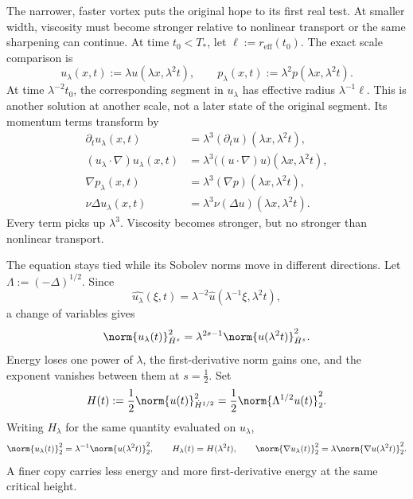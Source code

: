 
The narrower, faster vortex puts the original hope to its first real test. At smaller width, viscosity must become stronger relative to nonlinear transport or the same sharpening can continue.
At time \(t_0<T_*\), let \(\ell:=r_{\mathrm{eff}}(t_0)\). The exact scale comparison is
\[
  u_\lambda(x,t)
  :=
  \lambda u(\lambda x,\lambda^2t),
  \qquad
  p_\lambda(x,t)
  :=
  \lambda^2p(\lambda x,\lambda^2t).
\]
At time \(\lambda^{-2}t_0\), the corresponding segment in \(u_\lambda\) has effective radius \(\lambda^{-1}\ell\). This is another solution at another scale, not a later state of the original segment. Its momentum terms transform by
\[
\begin{aligned}
  \partial_tu_\lambda(x,t)
  &=
  \lambda^3(\partial_tu)(\lambda x,\lambda^2t),
  \\
  (u_\lambda\cdot\nabla)u_\lambda(x,t)
  &=
  \lambda^3\bigl((u\cdot\nabla)u\bigr)(\lambda x,\lambda^2t),
  \\
  \nabla p_\lambda(x,t)
  &=
  \lambda^3(\nabla p)(\lambda x,\lambda^2t),
  \\
  \nu\Delta u_\lambda(x,t)
  &=
  \lambda^3\nu(\Delta u)(\lambda x,\lambda^2t).
\end{aligned}
\]
Every term picks up \(\lambda^3\). Viscosity becomes stronger, but no stronger than nonlinear transport.


The equation stays tied while its Sobolev norms move in different directions. Let \(\Lambda:=(-\Delta)^{1/2}\). Since
\[
  \widehat{u_\lambda}(\xi,t)
  =
  \lambda^{-2}\widehat u(\lambda^{-1}\xi,\lambda^2t),
\]
a change of variables gives
\[
  \norm{u_\lambda(t)}_{\dot H^s}^2
  =
  \lambda^{2s-1}
  \norm{u(\lambda^2t)}_{\dot H^s}^2.
\]
Energy loses one power of \(\lambda\), the first-derivative norm gains one, and the exponent vanishes between them at \(s=\tfrac12\). Set
\[
  H(t)
  :=
  \frac12\norm{u(t)}_{\dot H^{1/2}}^2
  =
  \frac12\norm{\Lambda^{1/2}u(t)}_2^2.
\]
Writing \(H_\lambda\) for the same quantity evaluated on \(u_\lambda\),
\[
  \norm{u_\lambda(t)}_2^2
  =
  \lambda^{-1}\norm{u(\lambda^2t)}_2^2,
  \qquad
  H_\lambda(t)=H(\lambda^2t),
  \qquad
  \norm{\nabla u_\lambda(t)}_2^2
  =
  \lambda\norm{\nabla u(\lambda^2t)}_2^2.
\]
A finer copy carries less energy and more first-derivative energy at the same critical height.


